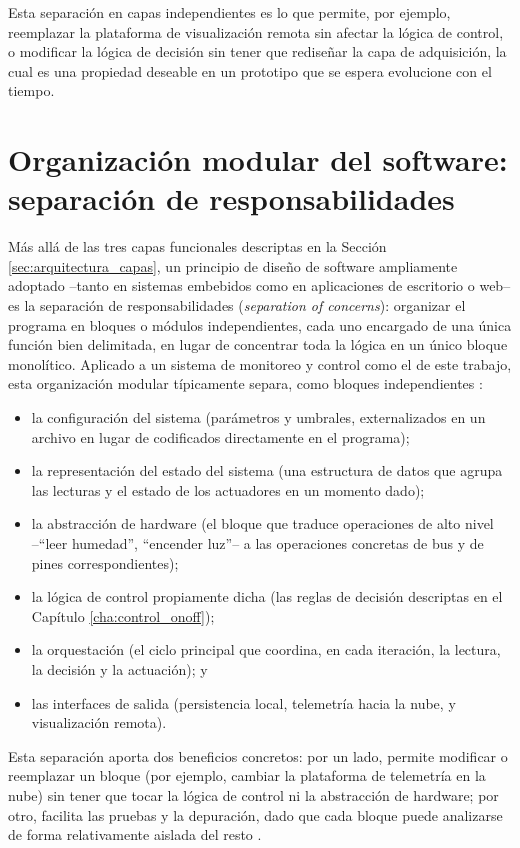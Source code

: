 Esta separación en capas independientes es lo que permite, por ejemplo, reemplazar la plataforma de visualización remota sin afectar la lógica de control, o modificar la lógica de decisión sin tener que rediseñar la capa de adquisición, la cual es una propiedad deseable en un prototipo que se espera evolucione con el tiempo.

\section{Organización modular del software: separación de responsabilidades}
\label{sec:modularidad}

Más allá de las tres capas funcionales descriptas en la Sección \ref{sec:arquitectura_capas}, un principio de diseño de software ampliamente adoptado --tanto en sistemas embebidos como en aplicaciones de escritorio o web-- es la separación de responsabilidades (\textit{separation of concerns}): organizar el programa en bloques o módulos independientes, cada uno encargado de una única función bien delimitada, en lugar de concentrar toda la lógica en un único bloque monolítico. Aplicado a un sistema de monitoreo y control como el de este trabajo, esta organización modular típicamente separa, como bloques independientes \cite{parnas1972}:

\begin{itemize}
    \item la configuración del sistema (parámetros y umbrales, externalizados en un archivo en lugar de codificados directamente en el programa);
    \item la representación del estado del sistema (una estructura de datos que agrupa las lecturas y el estado de los actuadores en un momento dado);
    \item la abstracción de hardware (el bloque que traduce operaciones de alto nivel --``leer humedad'', ``encender luz''-- a las operaciones concretas de bus y de pines correspondientes);
    \item la lógica de control propiamente dicha (las reglas de decisión descriptas en el Capítulo \ref{cha:control_onoff});
    \item la orquestación (el ciclo principal que coordina, en cada iteración, la lectura, la decisión y la actuación); y
    \item las interfaces de salida (persistencia local, telemetría hacia la nube, y visualización remota).
\end{itemize}

Esta separación aporta dos beneficios concretos: por un lado, permite modificar o reemplazar un bloque (por ejemplo, cambiar la plataforma de telemetría en la nube) sin tener que tocar la lógica de control ni la abstracción de hardware; por otro, facilita las pruebas y la depuración, dado que cada bloque puede analizarse de forma relativamente aislada del resto \cite{parnas1972}.

